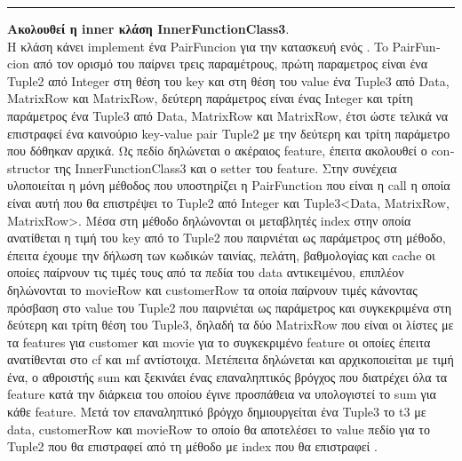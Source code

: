 \documentclass{report}
\begin{document}
{\rule{17cm}{0.1cm}



\textbf{Ακολουθεί η \textlatin{inner} κλάση \textlatin{InnerFunctionClass3}}.
\\
Η κλάση κάνει \textlatin{implement}  ένα \textlatin{PairFuncion} για την κατασκευή ενός . To \textlatin{PairFuncion} από τον ορισμό του παίρνει τρεις παραμέτρους, πρώτη παραμετρος είναι ένα \textlatin{Tuple2} από \textlatin{Integer} στη θέση του \textlatin{key} και στη θέση του \textlatin{value} ένα \textlatin{Tuple3} από \textlatin{Data, MatrixRow} και \textlatin{MatrixRow}, δεύτερη παράμετρος είναι  ένας \textlatin{Integer} και τρίτη παράμετρος ένα \textlatin{Tuple3} από \textlatin{Data, MatrixRow} και \textlatin{MatrixRow}, έτσι ώστε τελικά να επιστραφεί ένα καινούριο \textlatin{key-value pair Tuple2} με την δεύτερη και τρίτη παράμετρο που δόθηκαν αρχικά. Ως πεδίο δηλώνεται ο ακέραιος \textlatin{feature}, έπειτα ακολουθεί ο \textlatin{constructor} της \textlatin{InnerFunctionClass3} και ο \textlatin{setter} του \textlatin{feature}. Στην συνέχεια υλοποιείται η μόνη μέθοδος που υποστηρίζει η \textlatin{PairFunction} που είναι η \textlatin{call} η οποία είναι αυτή που θα επιστρέψει το \textlatin{Tuple2} από \textlatin{Integer} και \textlatin{Tuple3<Data, MatrixRow, MatrixRow>}. Μέσα στη μέθοδο δηλώνονται οι μεταβλητές \textlatin{index} στην οποία ανατίθεται η τιμή του \textlatin{key} από το \textlatin{Tuple2} που παιρνιέται ως παράμετρος στη μέθοδο, έπειτα έχουμε την δήλωση των κωδικών ταινίας, πελάτη, βαθμολογίας και \textlatin{cache} οι οποίες παίρνουν τις τιμές τους από τα πεδία του \textlatin{data} αντικειμένου, επιπλέον δηλώνονται το \textlatin{movieRow} και \textlatin{customerRow} τα οποία παίρνουν τιμές κάνοντας πρόσβαση στο \textlatin{value} του \textlatin{Tuple2} που παιρνιέται ως παράμετρος και συγκεκριμένα στη δεύτερη και τρίτη θέση του \textlatin{Tuple3}, δηλαδή τα δύο \textlatin{MatrixRow} που είναι οι λίστες με τα \textlatin{features} για \textlatin{customer} και \textlatin{movie} για το συγκεκριμένο \textlatin{feature} οι οποίες έπειτα ανατίθενται στο \textlatin{cf} και \textlatin{mf} αντίστοιχα. Μετέπειτα δηλώνεται και αρχικοποιείται με τιμή ένα, ο αθροιστής \textlatin{sum} και ξεκινάει ένας επαναληπτικός βρόγχος που διατρέχει όλα τα \textlatin{feature} κατά την διάρκεια του οποίου έγινε προσπάθεια να υπολογιστεί το \textlatin{sum} για κάθε \textlatin{feature}. Μετά τον επαναληπτικό βρόγχο δημιουργείται ένα \textlatin{Tuple3} το \textlatin{t3} με \textlatin{data, customerRow} και \textlatin{movieRow} το οποίο θα αποτελέσει το \textlatin{value} πεδίο για το \textlatin{
Tuple2} που θα επιστραφεί από τη μέθοδο με \textlatin{index}  που θα επιστραφεί .



}
\end{document}
